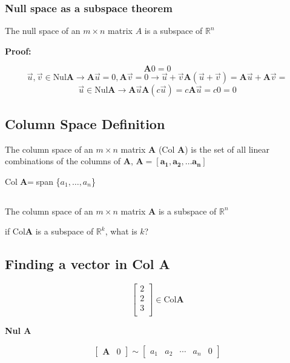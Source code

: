 \subsubsection{Null space as a subspace theorem}
The null space of an $m\times n$ matrix $A$ is a subspace of $\mathbb{R}^{n}$

\textbf{Proof: }

\[
	\textbf{A}0=0
\]
\[
	\vec{u},\vec{v} \in \mbox{Nul}\textbf{A} \to \textbf{A}\vec{u}=0, \textbf{A}\vec{v}=0 \to \vec{u}+\vec{v} \textbf{A} (\vec{u}+\vec{v})=\textbf{A}\vec{u}+\textbf{A}\vec{v}=
\]
\[
	\vec{u}\in \mbox{Nul}\textbf{A} \to \textbf{A}\vec{u} \textbf{A}(c\vec{u})=c\textbf{A}\vec{u}=c0=0
\]

\subsection{Column Space Definition}
 

The column space of an $m\times n$ matrix $\textbf{A}$ (Col $\textbf{A}$) is the set of all linear combinations of the columns of $\textbf{A}$, 
$\textbf{A}=[\boldsymbol{a_{1},a_{2}, \ldots a_{n}}]$


Col$\textbf{A} = $span \{$a_{1},\ldots,a_{n}$\}

\subsection{}
 The column space of an $m \times n$ matrix $\textbf{A}$ is a subspace of $\mathbb{R}^{n}$


if Col$\textbf{A}$ is a subspace of $\mathbb{R}^{k}$, what is $k$?


\subsection{Finding a vector in Col A}


\[
	\begin{bmatrix}
		2\\
		2\\
		3\\
	\end{bmatrix}
	\in \mbox{Col}\textbf{A}
\]

\textbf{Nul A}


\[	
	\begin{bmatrix}
		\textbf{A} & 0
	\end{bmatrix}
	\sim	
	\begin{bmatrix}
		a_1 & a_2 & \cdots & a_{n} & 0
	\end{bmatrix}
\]



